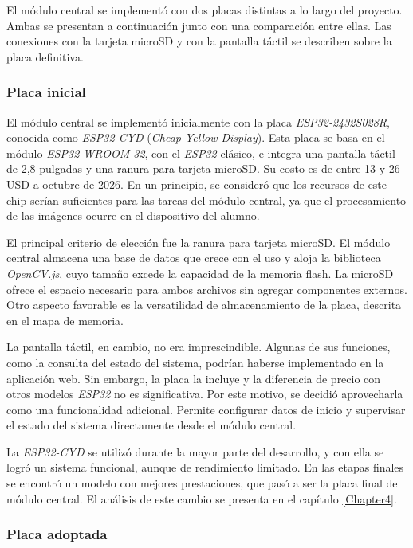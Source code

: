 El módulo central se implementó con dos placas distintas a lo largo del proyecto. Ambas se presentan a continuación junto con una comparación entre ellas. Las conexiones con la tarjeta microSD y con la pantalla táctil se describen sobre la placa definitiva.

\subsubsection{Placa inicial}

El módulo central se implementó inicialmente con la placa \emph{ESP32-2432S028R}, conocida como \emph{ESP32-CYD} (\emph{Cheap Yellow Display}). Esta placa se basa en el módulo \emph{ESP32-WROOM-32}, con el \emph{ESP32} clásico, e integra una pantalla táctil de 2,8 pulgadas y una ranura para tarjeta microSD. Su costo es de entre 13 y 26 USD a octubre de 2026. En un principio, se consideró que los recursos de este chip serían suficientes para las tareas del módulo central, ya que el procesamiento de las imágenes ocurre en el dispositivo del alumno.

El principal criterio de elección fue la ranura para tarjeta microSD. El módulo central almacena una base de datos que crece con el uso y aloja la biblioteca \emph{OpenCV.js}, cuyo tamaño excede la capacidad de la memoria flash. La microSD ofrece el espacio necesario para ambos archivos sin agregar componentes externos. Otro aspecto favorable es la versatilidad de almacenamiento de la placa, descrita en el mapa de memoria.

La pantalla táctil, en cambio, no era imprescindible. Algunas de sus funciones, como la consulta del estado del sistema, podrían haberse implementado en la aplicación web. Sin embargo, la placa la incluye y la diferencia de precio con otros modelos \emph{ESP32} no es significativa. Por este motivo, se decidió aprovecharla como una funcionalidad adicional. Permite configurar datos de inicio y supervisar el estado del sistema directamente desde el módulo central.

La \emph{ESP32-CYD} se utilizó durante la mayor parte del desarrollo, y con ella se logró un sistema funcional, aunque de rendimiento limitado. En las etapas finales se encontró un modelo con mejores prestaciones, que pasó a ser la placa final del módulo central. El análisis de este cambio se presenta en el capítulo \ref{Chapter4}.

\subsubsection{Placa adoptada}

